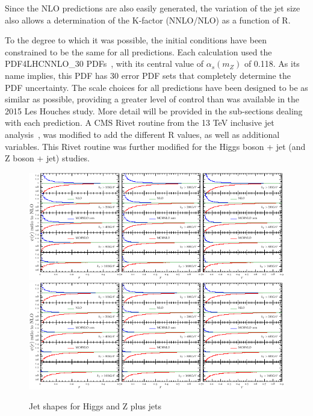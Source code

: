 \documentclass[aps,prd,onecolumn,fleqn,superscriptaddress,groupedaddress,nofootinbib,preprintnumbers,nobalancelastpage]{revtex4}
\begin{document}
Since the NLO predictions are also easily generated, the variation of the jet
size also allows a determination of the K-factor (NNLO/NLO) as a function of R. 

To the degree to which it was possible, the initial conditions have been
constrained to be the same for all predictions. Each calculation used the
PDF4LHCNNLO\_30 PDFs~\cite{Butterworth:2015oua}, with its central value of
$\alpha_s(m_Z)$ of 0.118. As its name implies, this PDF has 30 error PDF sets
that completely determine the PDF uncertainty. The scale choices for all
predictions have been designed to be as similar as possible, 
providing a greater level of control than was available in the 2015 Les Houches
study. More detail will be
provided in the sub-sections dealing with each prediction. 
A CMS Rivet routine from the 13 TeV  inclusive jet analysis~\cite{Khachatryan:2016wdh}, was
modified to add the different R values, as well as additional variables. This
Rivet routine was further modified for the Higgs boson + jet (and Z boson + jet)
studies. 

\begin{figure}
\includegraphics[width=\textwidth]{plots/shapes/hj/hjshapes-crop.pdf}\\
\includegraphics[width=\textwidth]{plots/shapes/zj/zjshapes-crop.pdf}
\caption{Jet shapes for Higgs and Z plus jets}
\end{figure}


\end{document}
